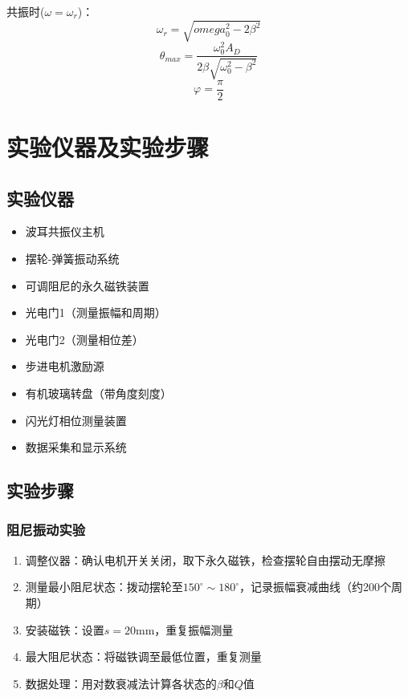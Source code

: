 \documentclass[UTF8]{ctexart}
\begin{document}
共振时($\omega=\omega_r$)：
\[ \omega_r = \sqrt{omega_0^2-2\beta^2} \]
\[ \theta_{max} = \frac{\omega_0^2A_D}{2\beta\sqrt{\omega_0^2-\beta^2}} \]
\[ \varphi = \frac{\pi}{2} \]

\section{实验仪器及实验步骤}
\subsection{实验仪器}
\begin{itemize}
    \item 波耳共振仪主机
    \item 摆轮-弹簧振动系统
    \item 可调阻尼的永久磁铁装置
    \item 光电门1（测量振幅和周期）
    \item 光电门2（测量相位差）
    \item 步进电机激励源
    \item 有机玻璃转盘（带角度刻度）
    \item 闪光灯相位测量装置
    \item 数据采集和显示系统
\end{itemize}

\subsection{实验步骤}
\subsubsection{阻尼振动实验}
\begin{enumerate}
    \item 调整仪器：确认电机开关关闭，取下永久磁铁，检查摆轮自由摆动无摩擦
    \item 测量最小阻尼状态：拨动摆轮至$150^\circ\sim180^\circ$，记录振幅衰减曲线（约200个周期）
    \item 安装磁铁：设置$s=20$mm，重复振幅测量
    \item 最大阻尼状态：将磁铁调至最低位置，重复测量
    \item 数据处理：用对数衰减法计算各状态的$\beta$和$Q$值
\end{enumerate}
\end{document}
